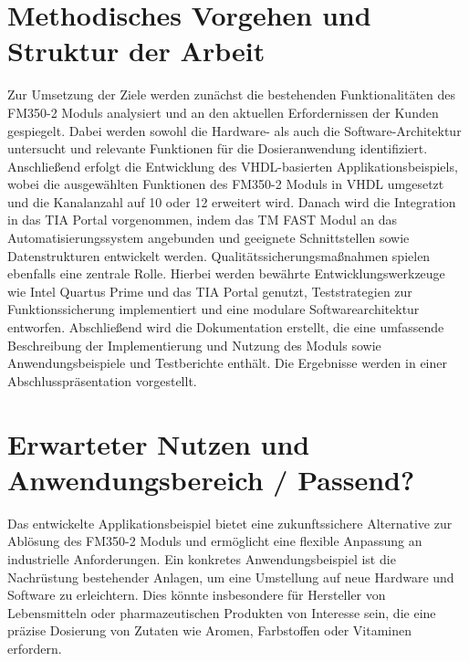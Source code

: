 \section{Methodisches Vorgehen und Struktur der Arbeit} 
Zur Umsetzung der Ziele werden zunächst die bestehenden Funktionalitäten des FM350-2 Moduls analysiert und an den aktuellen Erfordernissen der Kunden gespiegelt. Dabei werden sowohl 
die Hardware- als auch die Software-Architektur untersucht und relevante Funktionen für die Dosieranwendung identifiziert. Anschließend erfolgt die Entwicklung des VHDL-basierten 
Applikationsbeispiels, wobei die ausgewählten Funktionen des FM350-2 Moduls in VHDL umgesetzt und die Kanalanzahl auf 10 oder 12 erweitert wird. Danach wird die Integration in das 
TIA Portal vorgenommen, indem das TM FAST Modul an das Automatisierungssystem angebunden und geeignete Schnittstellen sowie Datenstrukturen entwickelt werden. 
Qualitätssicherungsmaßnahmen spielen ebenfalls eine zentrale Rolle. Hierbei werden bewährte Entwicklungswerkzeuge wie Intel Quartus Prime und das TIA Portal genutzt, 
Teststrategien zur Funktionssicherung implementiert und eine modulare Softwarearchitektur entworfen. Abschließend wird die Dokumentation erstellt, die eine umfassende 
Beschreibung der Implementierung und Nutzung des Moduls sowie Anwendungsbeispiele und Testberichte enthält. Die Ergebnisse werden in einer Abschlusspräsentation vorgestellt. 
\section{Erwarteter Nutzen und Anwendungsbereich / Passend?}
Das entwickelte Applikationsbeispiel bietet eine zukunftssichere Alternative zur Ablösung des FM350-2 Moduls und ermöglicht eine flexible Anpassung an industrielle Anforderungen. 
Ein konkretes Anwendungsbeispiel ist die Nachrüstung bestehender Anlagen, um eine Umstellung auf neue Hardware und Software zu erleichtern. Dies könnte insbesondere für Hersteller 
von Lebensmitteln oder pharmazeutischen Produkten von Interesse sein, die eine präzise Dosierung von Zutaten wie Aromen, Farbstoffen oder Vitaminen erfordern. 
